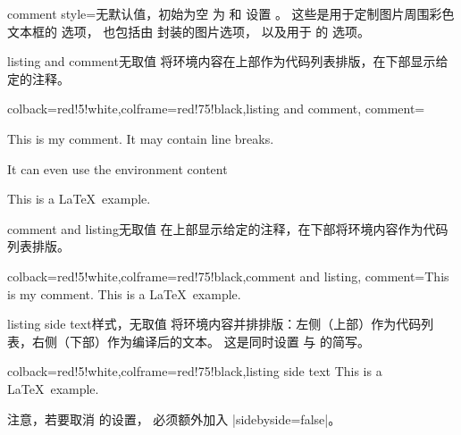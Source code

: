 \begin{docTcbKey}[][doc new=2014-11-14]{comment style}{=}{无默认值，初始为空}
  为  和  设置 。
  这些是用于定制图片周围彩色文本框的  选项，
  也包括由  封装的图片选项，
  以及用于  的  选项。
\end{docTcbKey}


\begin{docTcbKey}{listing and comment}{}{无取值}
  将环境内容在上部作为代码列表排版，在下部显示给定的注释。
\begin{dispExample}
\begin{tcblisting}{colback=red!5!white,colframe=red!75!black,listing and comment,
  comment={This is my comment. It may contain line breaks.\par
    It can even use the environment content
    \flqq\ignorespaces\tcbuselistingtext\unskip\frqq}}
This is a \LaTeX\ example.
\end{tcblisting}
\end{dispExample}
\end{docTcbKey}

\enlargethispage*{10mm}
\begin{docTcbKey}{comment and listing}{}{无取值}
  在上部显示给定的注释，在下部将环境内容作为代码列表排版。
\begin{dispExample}
\begin{tcblisting}{colback=red!5!white,colframe=red!75!black,comment and listing,
comment={This is my comment.}}
This is a \LaTeX\ example.
\end{tcblisting}
\end{dispExample}
\end{docTcbKey}


\clearpage
\begin{docTcbKey}{listing side text}{}{样式，无取值}
将环境内容并排排版：左侧（上部）作为代码列表，右侧（下部）作为编译后的文本。
这是同时设置  与  的简写。
\begin{dispExample}
\begin{tcblisting}{colback=red!5!white,colframe=red!75!black,listing side text}
This is a \LaTeX\ example.
\end{tcblisting}
\end{dispExample}
\begin{marker}
注意，若要取消  的设置，
必须额外加入 |sidebyside=false|。
\end{marker}
\end{docTcbKey}



